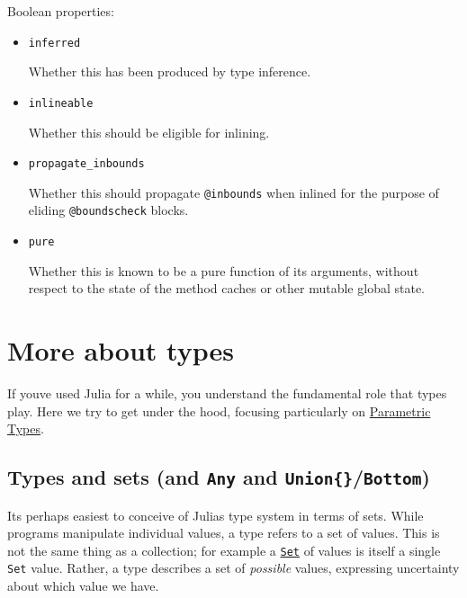 Boolean properties:



\begin{itemize}
\item \texttt{inferred}

Whether this has been produced by type inference.


\item \texttt{inlineable}

Whether this should be eligible for inlining.


\item \texttt{propagate\_inbounds}

Whether this should propagate \texttt{@inbounds} when inlined for the purpose of eliding \texttt{@boundscheck} blocks.


\item \texttt{pure}

Whether this is known to be a pure function of its arguments, without respect to the state of the method caches or other mutable global state.

\end{itemize}


\hypertarget{4038509094133832716}{}


\section{More about types}



If you{\textquotesingle}ve used Julia for a while, you understand the fundamental role that types play.  Here we try to get under the hood, focusing particularly on \hyperlink{5611641345231583503}{Parametric Types}.



\hypertarget{8213772846516553388}{}


\subsection{Types and sets (and \texttt{Any} and \texttt{Union\{\}}/\texttt{Bottom})}



It{\textquotesingle}s perhaps easiest to conceive of Julia{\textquotesingle}s type system in terms of sets. While programs manipulate individual values, a type refers to a set of values. This is not the same thing as a collection; for example a \hyperlink{1143189053501747033}{\texttt{Set}} of values is itself a single \texttt{Set} value. Rather, a type describes a set of \emph{possible} values, expressing uncertainty about which value we have.



